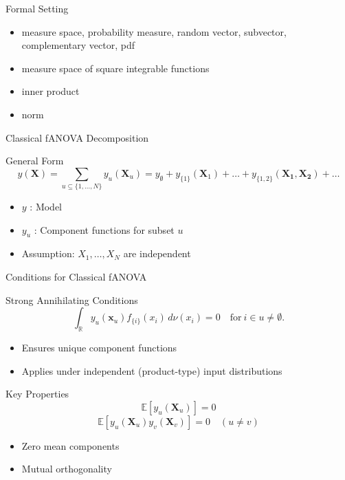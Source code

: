 \begin{frame}{Formal Setting}
  \begin{itemize}
    \item measure space, probability measure, random vector, subvector, complementary vector, pdf
    \item measure space of square integrable functions
    \item inner product
    \item norm
  \end{itemize}
  
\end{frame}

\begin{frame}{Classical fANOVA Decomposition} %
  \begin{block}{General Form}
    \[
      y(\boldsymbol{X}) = \sum_{u \subseteq \{1,\dots,N\}} y_{u}(\boldsymbol{X}_u) = y_{\emptyset} + y_{\{1\}}(\boldsymbol{X}_1) + \dots + y_{\{1, 2\}}(\boldsymbol{X_1, X_2}) + \dots
    \]
  \end{block}
  \begin{itemize}
    \item $y$ : Model
    \item $y_u$ : Component functions for subset $u$
    \item Assumption: $X_1, \dots, X_N$ are independent
  \end{itemize}
\end{frame}

\begin{frame}{Conditions for Classical fANOVA} %
  \begin{block}{Strong Annihilating Conditions}
    \[
      \int_{\mathbb{R}} y_u(\boldsymbol{x}_u) f_{\{i\}}(x_i) \, d\nu(x_i) = 0 \quad \text{for} \ i \in u \neq \emptyset.
    \]
  \end{block}
  \begin{itemize}
    \item Ensures unique component functions
    \item Applies under independent (product-type) input distributions
  \end{itemize}
\end{frame}

\begin{frame}{Key Properties}
  \[
    \mathbb{E}[y_u(\boldsymbol{X}_u)] = 0
  \]
  \[
    \mathbb{E}[y_u(\boldsymbol{X}_u) y_v(\boldsymbol{X}_v)] = 0 \quad (u \neq v)
  \]
  \begin{itemize}
    \item Zero mean components
    \item Mutual orthogonality
  \end{itemize}
\end{frame}

